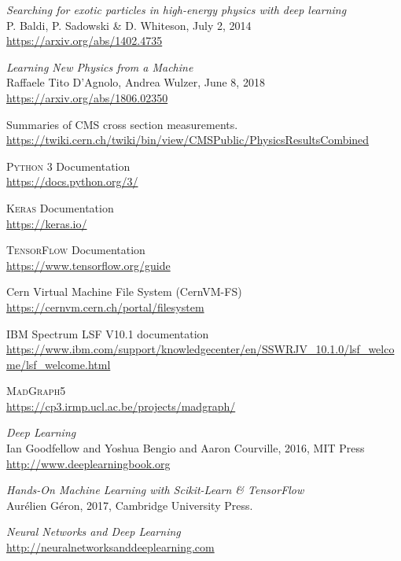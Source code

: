 \begin{thebibliography}{99}
\textit{Searching for exotic particles in high-energy physics with deep learning}
\\P. Baldi, P. Sadowski \& D. Whiteson, July 2, 2014
\\\url{https://arxiv.org/abs/1402.4735}

\textit{Learning New Physics from a Machine}
\\Raffaele Tito D'Agnolo, Andrea Wulzer, June 8, 2018
\\\url{https://arxiv.org/abs/1806.02350}

Summaries of CMS cross section measurements.
\\\url{https://twiki.cern.ch/twiki/bin/view/CMSPublic/PhysicsResultsCombined}

\textsc{Python 3} Documentation
\\\url{https://docs.python.org/3/}

\textsc{Keras} Documentation 
\\\url{https://keras.io/}
 
\textsc{TensorFlow} Documentation 
\\\url{https://www.tensorflow.org/guide}

Cern Virtual Machine File System (CernVM-FS)
\\\url{https://cernvm.cern.ch/portal/filesystem}

IBM Spectrum LSF V10.1 documentation
\\\url{https://www.ibm.com/support/knowledgecenter/en/SSWRJV_10.1.0/lsf_welcome/lsf_welcome.html}

\textsc{MadGraph5}
\\\url{https://cp3.irmp.ucl.ac.be/projects/madgraph/}
 
\textit{Deep Learning}
\\Ian Goodfellow and Yoshua Bengio and Aaron Courville, 2016, MIT Press
\\\url{http://www.deeplearningbook.org}

\textit{Hands-On Machine Learning with Scikit-Learn \& TensorFlow}
\\Aurélien Géron, 2017, Cambridge University Press.

\textit{Neural Networks and Deep Learning}
\\\url{http://neuralnetworksanddeeplearning.com}


\end{thebibliography}
